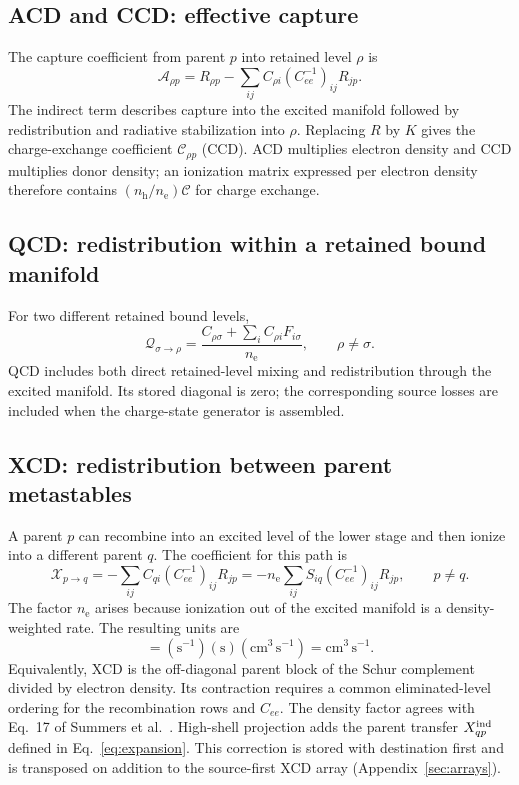 \documentclass[11pt,a4paper]{article}
\newcommand{\nelec}{n_{\mathrm e}}
\newcommand{\nh}{n_{\mathrm h}}
\numberwithin{equation}{section}
\begin{document}
\subsection{ACD and CCD: effective capture}

The capture coefficient from parent $p$ into retained level $\rho$ is
\begin{equation}
 \mathcal A_{\rho p}=R_{\rho p}
              -\sum_{ij}C_{\rho i}(C_{ee}^{-1})_{ij}R_{jp}.
\end{equation}
The indirect term describes capture into the excited manifold followed
by redistribution and radiative stabilization into $\rho$. Replacing
$R$ by $K$ gives the charge-exchange coefficient $\mathcal C_{\rho p}$
(CCD). ACD multiplies electron density and CCD multiplies donor density;
an ionization matrix expressed per electron density therefore contains
$(\nh/\nelec)\mathcal C$ for charge exchange.

\subsection{QCD: redistribution within a retained bound manifold}

For two different retained bound levels,
\begin{equation}
 \mathcal Q_{\sigma\to\rho}
 =\frac{C_{\rho\sigma}+\sum_iC_{\rho i}F_{i\sigma}}{\nelec},
 \qquad \rho\ne\sigma.
\end{equation}
QCD includes both direct retained-level mixing and redistribution
through the excited manifold. Its stored diagonal is zero; the
corresponding source losses are included when the charge-state
generator is assembled.

\subsection{XCD: redistribution between parent metastables}\label{sec:xcd}

A parent $p$ can recombine into an excited level of the lower stage and then
ionize into a different parent $q$. The coefficient for this path is
\begin{equation}\label{eq:xcd}
 \mathcal X_{p\to q}=-\sum_{ij}C_{qi}(C_{ee}^{-1})_{ij}R_{jp}
       =-\nelec\sum_{ij}S_{iq}(C_{ee}^{-1})_{ij}R_{jp},\qquad p\ne q.
\end{equation}
The factor $\nelec$ arises because ionization out of the excited
manifold is a density-weighted rate. The resulting units are
\begin{equation}
 [\nelec S][C_{ee}^{-1}][R]
  =(\mathrm{s}^{-1})(\mathrm s)(\mathrm{cm}^3\,\mathrm{s}^{-1})
  =\mathrm{cm}^3\,\mathrm{s}^{-1}.
\end{equation}
Equivalently, XCD is the off-diagonal parent block of the Schur
complement divided by electron density. Its contraction requires a
common eliminated-level ordering for the recombination rows and
$C_{ee}$. The density factor agrees with Eq.~17 of Summers et
al.~\cite{summers2006}. High-shell projection adds the parent transfer
$X^{\rm ind}_{qp}$ defined in Eq.~\eqref{eq:expansion}. This correction
is stored with destination first and is transposed on addition to the
source-first XCD array (Appendix~\ref{sec:arrays}).
\end{document}
